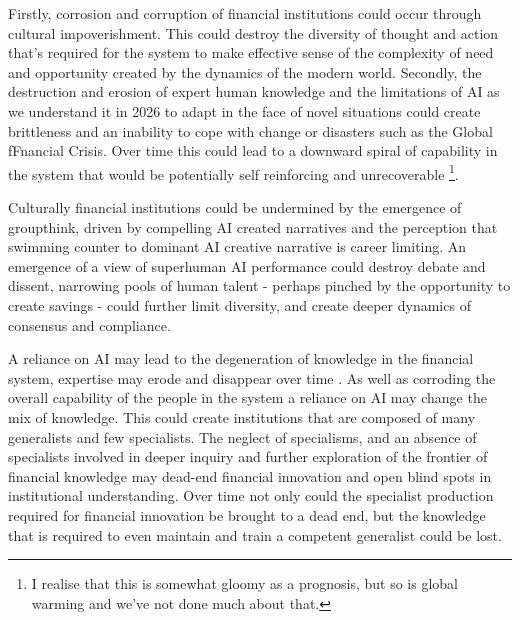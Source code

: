 \documentclass[11pt]{article}
\begin{document}
Firstly, corrosion and corruption of financial institutions could occur through cultural impoverishment. This could destroy the diversity of thought and action that's required for the system to make effective sense of the complexity of need and opportunity created by the dynamics of the modern world. Secondly, the destruction and erosion of expert human knowledge and the limitations of AI as we understand it in 2026 to adapt in the face of novel situations could create brittleness and an inability to cope with change or disasters such as the Global fFnancial Crisis. Over time this could lead to a downward spiral of capability in the system that would be potentially self reinforcing and unrecoverable \footnote{I realise that this is somewhat gloomy as a prognosis, but so is global warming and we've not done much about that.}. 

Culturally financial institutions could be undermined by the emergence of groupthink, driven by compelling AI created narratives and the perception that swimming counter to dominant AI creative narrative is career limiting. An emergence of a view of superhuman AI performance could destroy debate and dissent, narrowing pools of human talent - perhaps pinched by the opportunity to create savings - could further limit diversity, and create deeper dynamics of consensus and compliance. 

A reliance on AI may lead to the degeneration of knowledge in the financial system, expertise may erode and disappear over time \cite{lovett_tragedy_2026}. As well as corroding the overall capability of the people in the system a reliance on AI may change the mix of knowledge. This could create institutions that are composed of many generalists and few specialists. The neglect of specialisms, and an absence of specialists involved in deeper inquiry and further exploration of the frontier of financial knowledge may dead-end financial innovation and open blind spots in institutional understanding. Over time not only could the specialist production required for financial innovation be brought to a dead end, but the knowledge that is required to even maintain and train a competent generalist could be lost. 
\end{document}
